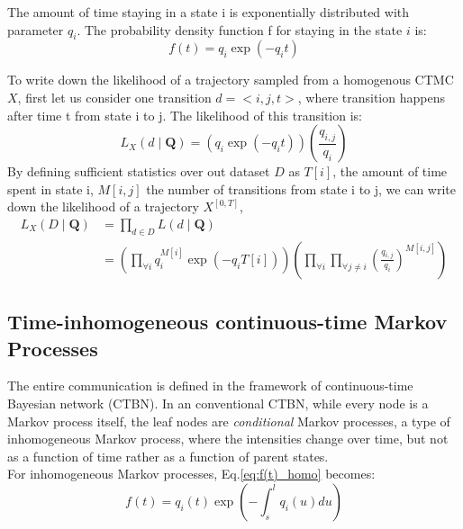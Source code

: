 \documentclass[]{article}
\begin{document}
	The amount of time staying in a state i is exponentially distributed with parameter $ q_{i} $. The probability density function f for staying in the state $ i $ is:
	\begin{equation}
	f(t)=q_{i} \exp \left(-q_{i} t\right)
	\label{eq:f(t)_homo}
	\end{equation}
	
	To write down the likelihood of a trajectory sampled from a homogenous CTMC $ X $, first let us consider one transition $ d = <i,j,t> $, where transition happens after time t from state i to j. The likelihood of this transition is:
	\begin{equation}
	L_{X}(d \mid \textbf{Q})=\left(q_{i} \exp \left(-q_{i} t\right)\right)\left(\frac{q_{i,j}}{q_{i}}\right)
	\end{equation}
	By defining sufficient statistics over out dataset $ D $ as $ T[i] $, the amount of time spent in state i, $ M[i,j] $ the number of transitions from state i to j, we can write down the likelihood of a trajectory $  X^{\left[0,T\right] } $,
	\begin{equation}
	\begin{split}
	L_{X}(D \mid \textbf{Q}) &=  \prod_{d \in D} L(d \mid \textbf{Q}) \\&=\left(\prod_{\forall i} q_{i}^{M[i]} \exp \left(-q_{i} T[i]\right)\right)\left(\prod_{\forall i} \prod_{\forall j \neq i} \left(\frac{q_{i,j}}{q_{i}}\right)^{M\left[i, j\right]}\right)
	\label{eq:lh_traj_homo}
	\end{split}
	\end{equation}
	
	\subsection{Time-inhomogeneous continuous-time Markov Processes}
	The entire communication is defined in the framework of continuous-time Bayesian network (CTBN). In an conventional CTBN, while every node is a Markov process itself, the leaf nodes are \textit{conditional} Markov processes, a type of inhomogeneous Markov process, where the intensities change over time, but not as a function of time rather as a function of parent states. \cite{Nodelman1995} \\
	
	For inhomogeneous Markov processes, Eq.\ref{eq:f(t)_homo} becomes:
	\begin{equation}
	f(t) = q_{i}(t) \exp \left(-\int_{s}^{l} q_{i}(u) d u\right)
	\end{equation}
	
\end{document}
